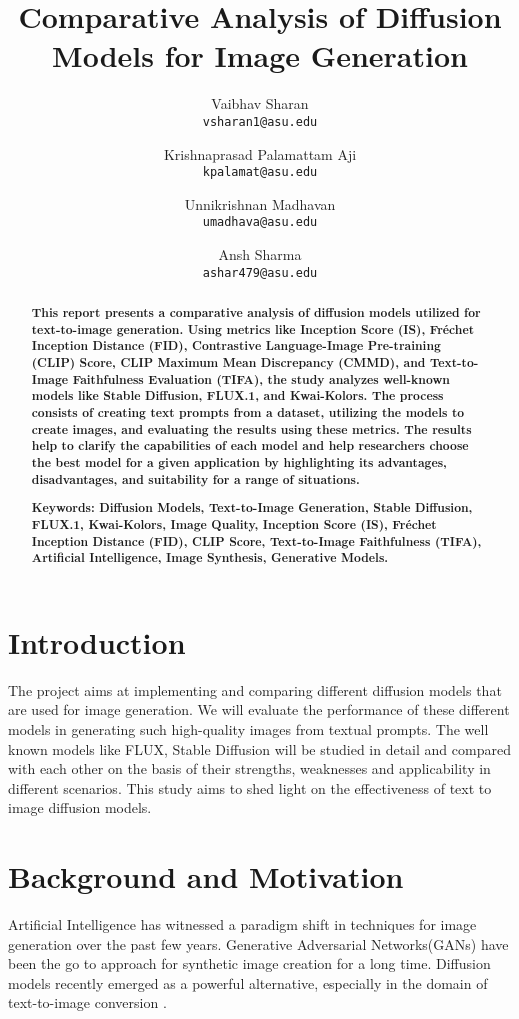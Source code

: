 \documentclass{article}
\title{Comparative Analysis of Diffusion Models for Image Generation
}
\author{
  Vaibhav Sharan\\
  \texttt{vsharan1@asu.edu} \\ 
  \and
  Krishnaprasad Palamattam Aji\\
  \texttt{kpalamat@asu.edu}\\
  \and
  Unnikrishnan Madhavan\\
  \texttt{umadhava@asu.edu}\\
  \and
  Ansh Sharma\\
  \texttt{ashar479@asu.edu}
}
\begin{document}
\maketitle

\begin{abstract}
    \textbf{This report presents a comparative analysis of diffusion models utilized for text-to-image generation. Using metrics like Inception Score (IS), Fréchet Inception Distance (FID), Contrastive Language-Image Pre-training (CLIP) Score, CLIP Maximum Mean Discrepancy (CMMD), and Text-to-Image Faithfulness Evaluation (TIFA), the study analyzes well-known models like Stable Diffusion, FLUX.1, and Kwai-Kolors. The process consists of creating text prompts from a dataset, utilizing the models to create images, and evaluating the results using these metrics. The results help to clarify the capabilities of each model and help researchers choose the best model for a given application by highlighting its advantages, disadvantages, and suitability for a range of situations.}
    
    \textbf{Keywords: Diffusion Models, Text-to-Image Generation, Stable Diffusion, FLUX.1, Kwai-Kolors, Image Quality, Inception Score (IS), Fréchet Inception Distance (FID), CLIP Score, Text-to-Image Faithfulness (TIFA), Artificial Intelligence, Image Synthesis, Generative Models.}
\end{abstract}

\section{Introduction}
The project aims at implementing and comparing different diffusion models that are used for 
image generation. We will evaluate the performance of these different models in generating
such high-quality images from textual prompts. The well known models like FLUX, Stable
Diffusion will be studied in detail and compared with each other on the basis of
their strengths, weaknesses and applicability in different scenarios. This study aims to shed light
on the effectiveness of text to image diffusion models.


\section{Background and Motivation}
Artificial Intelligence has witnessed a paradigm shift in techniques for image generation over the past few years. 
Generative Adversarial Networks(GANs) have been the go to approach for synthetic image creation for a long time. 
Diffusion models recently emerged as a powerful alternative, especially in the domain of text-to-image conversion \cite{dhariwal2021}. 
\end{document}
